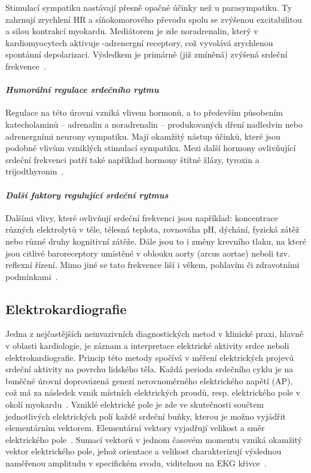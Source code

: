 Stimulací sympatiku nastávají přesně opačné účinky než u parasympatiku. Ty
zahrnují zrychlení HR a síňokomorového převodu spolu se zvýšenou excitabilitou a
silou kontrakcí myokardu. Mediátorem je zde noradrenalin, který v
kardiomyocytech aktivuje \textbeta-adrenergní receptory, což vyvolává zrychlenou
spontánní depolarizaci. Výsledkem je primárně (již zmíněná) zvýšená srdeční
frekvence~\cite{Kittnar2020}.

\paragraph*{\textit{Humorální regulace srdečního rytmu}\\} Regulace na této
úrovni vzniká vlivem hormonů, a to především působením katecholaminů --
adrenalin a noradrenalin -- produkovaných dření nadledvin nebo adrenergními
neurony sympatiku. Mají okamžitý nástup účinků, které jsou podobné vlivům
vzniklých stimulací sympatiku. Mezi další hormony ovlivňující srdeční frekvenci
patří také například hormony štítné žlázy, tyroxin a
trijodthyronin~\cite{Kittnar2020,Orel2019}.

\paragraph*{\textit{Další faktory regulující srdeční rytmus}\\} Dalšími vlivy,
které ovlivňují srdeční frekvenci jsou například: koncentrace různých
elektrolytů v těle, tělesná teplota, rovnováha pH, dýchání, fyzická zátěž nebo
různé druhy kognitivní zátěže. Dále jsou to i změny krevního tlaku, na které
jsou citlivé baroreceptory umístěné v oblouku aorty (arcus aortae) neboli tzv.
reflexní řízení. Mimo jiné se tato frekvence liší i věkem, pohlavím či
zdravotními podmínkami~\cite{Kittnar2020}.

\subsection{Elektrokardiografie}
\label{section:electrocardiography}
Jedna z nejčastějších neinvazivních diagnostických metod v klinické praxi,
hlavně v oblasti kardiologie, je záznam a interpretace elektrické aktivity srdce
neboli elektrokardiografie. Princip této metody spočívá v měření elektrických
projevů srdeční aktivity na povrchu lidského těla. Každá perioda srdečního cyklu
je na buněčné úrovní doprovázená genezí nerovnoměrného elektrického napětí (AP),
což má za následek vznik místních elektrických proudů, resp. elektrického pole v
okolí myokardu~\cite{Kittnar2020}. Vzniklé elektrické pole je zde ve skutečnosti
součtem jednotlivých elektrických polí každé srdeční buňky, kterou je možno
vyjádřit elementárním vektorem. Elementární vektory vyjadřují velikost a směr
elektrického pole~\cite{Stejfa2006}. Sumací vektorů v jednom časovém momentu
vzniká okamžitý vektor elektrického pole, jehož orientace a velikost
charakterizují výslednou naměřenou amplitudu v specifickém svodu, viditelnou na
EKG křivce~\cite{Surawicz2008,Kittnar2020}.

